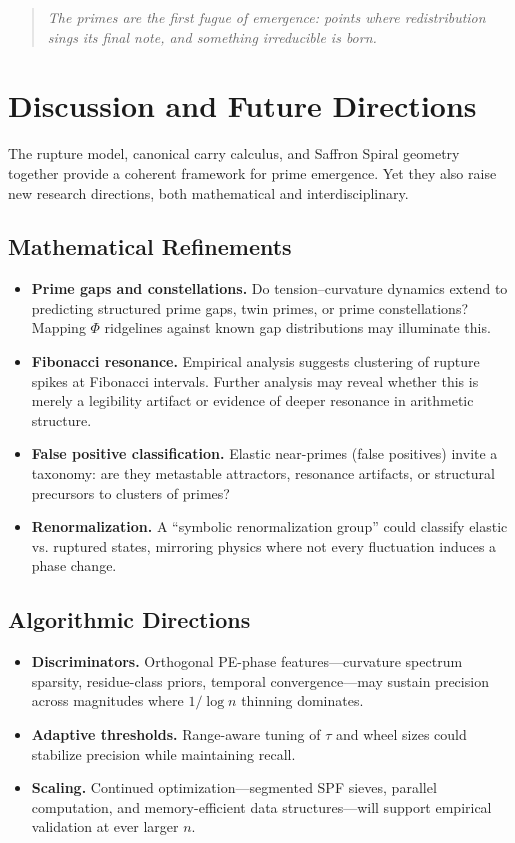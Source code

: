 \documentclass[11pt]{article}
\theoremstyle{plain}
\theoremstyle{definition}
\begin{document}
\begin{quote}
\emph{The primes are the first fugue of emergence:  
points where redistribution sings its final note,  
and something irreducible is born.}
\end{quote}

\section{Discussion and Future Directions}

The rupture model, canonical carry calculus, and Saffron Spiral geometry together provide a coherent framework for prime emergence. Yet they also raise new research directions, both mathematical and interdisciplinary.

\subsection{Mathematical Refinements}
\begin{itemize}
  \item \textbf{Prime gaps and constellations.} Do tension–curvature dynamics extend to predicting structured prime gaps, twin primes, or prime constellations? Mapping $\Phi$ ridgelines against known gap distributions may illuminate this.
  \item \textbf{Fibonacci resonance.} Empirical analysis suggests clustering of rupture spikes at Fibonacci intervals. Further analysis may reveal whether this is merely a legibility artifact or evidence of deeper resonance in arithmetic structure.
  \item \textbf{False positive classification.} Elastic near-primes (false positives) invite a taxonomy: are they metastable attractors, resonance artifacts, or structural precursors to clusters of primes?
  \item \textbf{Renormalization.} A “symbolic renormalization group” could classify elastic vs. ruptured states, mirroring physics where not every fluctuation induces a phase change.
\end{itemize}

\subsection{Algorithmic Directions}
\begin{itemize}
  \item \textbf{Discriminators.} Orthogonal PE-phase features—curvature spectrum sparsity, residue-class priors, temporal convergence—may sustain precision across magnitudes where $1/\log n$ thinning dominates.
  \item \textbf{Adaptive thresholds.} Range-aware tuning of $\tau$ and wheel sizes could stabilize precision while maintaining recall.  
  \item \textbf{Scaling.} Continued optimization—segmented SPF sieves, parallel computation, and memory-efficient data structures—will support empirical validation at ever larger $n$.
\end{itemize}
\end{document}
